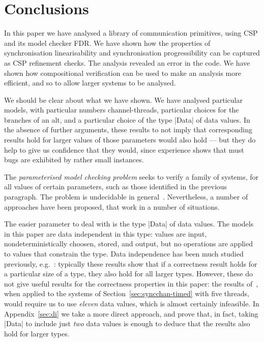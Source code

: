 \section{Conclusions}
\label{sec:conc}

In this paper we have analysed a library of communication primitives, using
CSP and its model checker FDR\@.  We have shown how the properties of
synchronisation linearisability and synchronisation progressibility can be  
captured as CSP refinement checks.  The analysis revealed an error in the
code.  We have shown how compositional verification can be used to make an
analysis more efficient, and so to allow larger systems to be analysed. 



We should be clear about what we have shown.  We have analysed particular
models, with particular numbers channel-threads, particular choices for the
branches of an alt, and a particular choice of the type |Data| of data
values.  In the absence of further arguments, these results to not imply that
corresponding results hold for larger values of those parameters would also
hold --- but they do help to give us confidence that they would, since
experience shows that must bugs are exhibited by rather small instances.  

The \emph{parameterised model checking problem} seeks to verify a family of
systems, for all values of certain parameters, such as those identified in the
previous paragraph.  The problem is undecidable in general~\cite{apt-kozen,
  tomasz-gavin-CA}.  Nevertheless, a number of approaches have been proposed,
that work in a number of situations.

The easier parameter to deal with is the type |Data| of data values.  The
models in this paper are data independent in this type: values are input,
nondeterministically choosen, stored, and output, but no operations are
applied to values that constrain the type.  Data independence has been much
studied previously, e.g.~\cite{Wolper-1986, ranko-thesis}: typically these
results show that if a correctness result holds for a particular size of a
type, they also hold for all larger types.  However, these do not give
useful results for the correctness properties in this paper: the results
of~\cite[Section~15.2]{awr:TPC}, when applied to the systems of
Section~\ref{sec:syncchan-timed} with five threads, would require us to use
\emph{eleven} data values, which is almost certainly infeasible.  In
Appendix~\ref{sec:di} we take a more direct approach, and prove that, in fact,
taking |Data| to include just \emph{two} data values is enough to deduce that
the results also hold for larger types.


